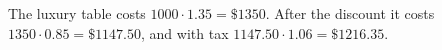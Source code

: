 The luxury table costs $1000\cdot1.35=\$1350$. After the discount it costs $1350\cdot0.85=\$1147.50$, and with tax $1147.50\cdot1.06=\boxed{\$1216.35}$.
